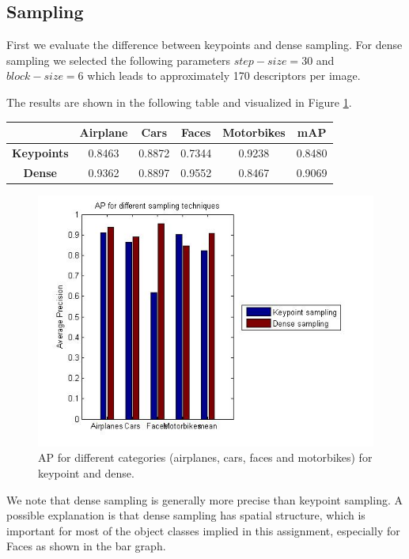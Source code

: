 \documentclass[11pt]{article}
\begin{document}
\subsection{Sampling}
First we evaluate the difference between keypoints and dense sampling. For dense sampling we selected the following parameters $step-size = 30$ and $block-size = 6$ which leads to approximately 170 descriptors per image. 

The results are shown in the following table and visualized in Figure \ref{fig:sampling}.

\begin{center}
	\begin{tabular}{| c | c | c | c | c | c |}
		\hline
		\textbf{} & \textbf{Airplane} & \textbf{Cars} & \textbf{Faces} & \textbf{Motorbikes} & \textbf{mAP} \\ \hline
		\textbf{Keypoints} & 0.8463 & 0.8872 & 0.7344 & 0.9238 & 0.8480 \\ \hline
		\textbf{Dense} & 0.9362 & 0.8897 & 0.9552 & 0.8467 & 0.9069 \\ 
		\hline
	\end{tabular}
\end{center}

\begin{figure}[h]
	\centering
	\includegraphics[width=.8\textwidth]{img/sampling.jpg}
	\caption{AP for different categories (airplanes, cars, faces and motorbikes) for keypoint and dense.}
	\label{fig:sampling}
\end{figure}

We note that dense sampling is generally more precise than keypoint sampling. A possible explanation is that dense sampling has spatial structure, which is important for most of the object classes implied in this assignment, especially for Faces as shown in the bar graph.
\end{document}
